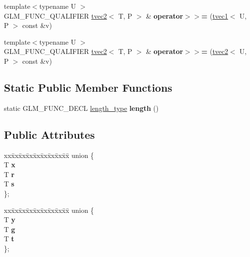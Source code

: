 \begin{DoxyCompactItemize}
{\footnotesize template$<$typename U $>$ }\\G\+L\+M\+\_\+\+F\+U\+N\+C\+\_\+\+Q\+U\+A\+L\+I\+F\+I\+ER \hyperlink{structglm_1_1tvec2}{tvec2}$<$ T, P $>$ \& {\bfseries operator$>$$>$=} (\hyperlink{structglm_1_1tvec1}{tvec1}$<$ U, P $>$ const \&v)
\item 
\mbox{\label{structglm_1_1tvec2_a6c2dc839f420cba67d7c0dfaab196081}} 
{\footnotesize template$<$typename U $>$ }\\G\+L\+M\+\_\+\+F\+U\+N\+C\+\_\+\+Q\+U\+A\+L\+I\+F\+I\+ER \hyperlink{structglm_1_1tvec2}{tvec2}$<$ T, P $>$ \& {\bfseries operator$>$$>$=} (\hyperlink{structglm_1_1tvec2}{tvec2}$<$ U, P $>$ const \&v)
\end{DoxyCompactItemize}
\subsection*{Static Public Member Functions}
\begin{DoxyCompactItemize}
\item 
\mbox{\label{structglm_1_1tvec2_a646329366ca3d3874854a5445aefd4ae}} 
static G\+L\+M\+\_\+\+F\+U\+N\+C\+\_\+\+D\+E\+CL \hyperlink{structglm_1_1tvec2_a5a5ddebab821a3cf9185772386afbe8d}{length\+\_\+type} {\bfseries length} ()
\end{DoxyCompactItemize}
\subsection*{Public Attributes}
\begin{DoxyCompactItemize}
\item 
\mbox{\label{structglm_1_1tvec2_aaa10898d7b0c397b32983df5548852a7}} 
\begin{tabbing}
xx\=xx\=xx\=xx\=xx\=xx\=xx\=xx\=xx\=\kill
union \{\\
\>T {\bfseries x}\\
\>T {\bfseries r}\\
\>T {\bfseries s}\\
\}; \\

\end{tabbing}\item 
\mbox{\label{structglm_1_1tvec2_a487b2b25b32b7a85820032d71ff79c93}} 
\begin{tabbing}
xx\=xx\=xx\=xx\=xx\=xx\=xx\=xx\=xx\=\kill
union \{\\
\>T {\bfseries y}\\
\>T {\bfseries g}\\
\>T {\bfseries t}\\
\}; \\

\end{tabbing}\end{DoxyCompactItemize}


